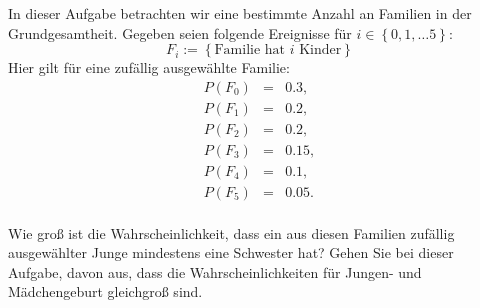\begin{Exercise}
	In dieser Aufgabe betrachten wir eine bestimmte Anzahl an Familien in der Grundgesamtheit. Gegeben seien folgende Ereignisse für $i\in\left\lbrace 0,1,\dots 5\right\rbrace$:
	\begin{equation*}
		F_i:=\left\lbrace \text{Familie hat } i \text{ Kinder}\right\rbrace
	\end{equation*} 
	Hier gilt für eine zufällig ausgewählte Familie:
	\begin{eqnarray*}
		P(F_0)&=&0.3,\\
		P(F_1)&=&0.2,\\
		P(F_2)&=&0.2,\\
		P(F_3)&=&0.15,\\
		P(F_4)&=&0.1,\\
		P(F_5)&=&0.05.
	\end{eqnarray*}\\
	Wie groß ist die Wahrscheinlichkeit, dass ein aus diesen Familien zufällig ausgewählter Junge mindestens eine Schwester hat? Gehen Sie bei dieser Aufgabe, davon aus, dass die Wahrscheinlichkeiten für Jungen- und Mädchengeburt gleichgroß sind.
\end{Exercise}

